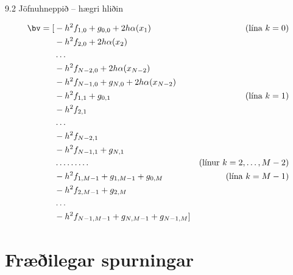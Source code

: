 \begin{frame}{9.2 Jöfnuhneppið -- hægri hliðin}
{\  }

{\small \begin{align*}
  \bv = [ 
  &-h^2 f_{1,0} + g_{0,0} + 2h\alpha(x_1) & (\text{lína } k=0)\\
  &-h^2 f_{2,0} + 2h\alpha(x_2)  \\
  &\ldots \\
  &-h^2 f_{N-2,0} + 2h\alpha(x_{N-2}) \\
  &-h^2 f_{N-1,0} + g_{N,0} + 2h\alpha(x_{N-2}) \\
  &-h^2 f_{1,1} + g_{0,1}   & (\text{lína } k=1)\\
  &-h^2 f_{2,1} \\
  &\ldots \\
  &-h^2 f_{N-2,1}  \\
  &-h^2 f_{N-1,1} +  g_{N,1} \\
   & \ldots \ldots \ldots  & (\text{línur } k=2,\ldots,M-2)\\
  &-h^2 f_{1,M-1} + g_{1,M-1} + g_{0,M} & (\text{lína } k=M-1)\\
  &-h^2 f_{2,M-1} + g_{2,M} \\
  &\ldots \\
  &-h^2 f_{N-1,M-1} + g_{N,M-1} + g_{N-1,M} ]\\
  \end{align*}}
\end{frame}



\section*{Fræðilegar spurningar}

